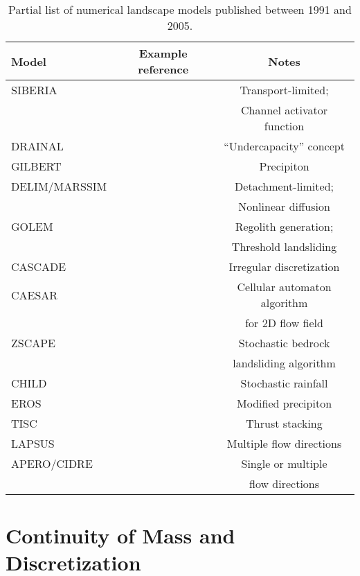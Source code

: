 \documentclass[12pt,reqno]{amsart}
\begin{document}
\begin{center}
\begin{table}
\caption{Partial list of numerical landscape models published between 1991 and 2005.}
\small
 \begin{tabular}{ l c c}
   \hline
   Model & Example reference & Notes\\
   \hline
   SIBERIA & \citet{willgoose1991coupled} & Transport-limited; \\
   & & Channel activator function \\
   DRAINAL & \citet{beaumont1992erosional} & ``Undercapacity'' concept \\
   GILBERT & \citet{chase1992fluvial} & Precipiton \\
   DELIM/MARSSIM & \citet{howard1994detachment} & Detachment-limited; \\
   & & Nonlinear diffusion \\
   GOLEM & \citet{tucker1994erosional} & Regolith generation; \\
   & & Threshold landsliding \\
   CASCADE & \citet{braun1997modelling} & Irregular discretization \\
   CAESAR & \citet{coulthard1996cellular} & Cellular automaton algorithm \\
   & & for 2D flow field \\
   ZSCAPE & \citet{densmore1998landsliding} & Stochastic bedrock \\
   & & landsliding algorithm \\
   CHILD & \citet{tucker2000stochastic} & Stochastic rainfall \\
   EROS & \citet{crave2001stochastic} & Modified precipiton \\
   TISC & \citet{garcia2002interplay} & Thrust stacking \\
   LAPSUS & \citet{schoorl2002modeling} & Multiple flow directions \\
   APERO/CIDRE & \citet{carretier2005does} & Single or multiple \\
   & & flow directions \\
   \hline
  \end{tabular}
  \normalsize
  \label{table1}
 \end{table}
\end{center}

\section{Continuity of Mass and Discretization}
\end{document}
